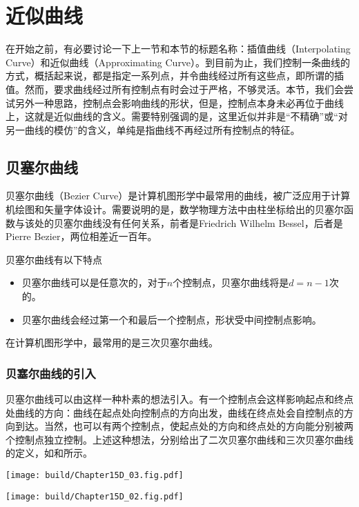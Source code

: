 \section{近似曲线}
在开始之前，有必要讨论一下上一节和本节的标题名称：插值曲线（Interpolating Curve）和近似曲线（Approximating Curve）。到目前为止，我们控制一条曲线的方式，概括起来说，都是指定一系列点，并令曲线经过所有这些点，即所谓的插值。然而，要求曲线经过所有控制点有时会过于严格，不够灵活。本节，我们会尝试另外一种思路，控制点会影响曲线的形状，但是，控制点本身未必再位于曲线上，这就是近似曲线的含义。需要特别强调的是，这里近似并非是“不精确”或“对另一曲线的模仿”的含义，单纯是指曲线不再经过所有控制点的特征。


\subsection{贝塞尔曲线}
贝塞尔曲线（Bezier Curve）是计算机图形学中最常用的曲线，被广泛应用于计算机绘图和矢量字体设计。需要说明的是，数学物理方法中由柱坐标给出的贝塞尔函数与该处的贝塞尔曲线没有任何关系，前者是Friedrich Wilhelm Bessel，后者是Pierre Bezier，两位相差近一百年。

贝塞尔曲线有以下特点
\begin{itemize}
    \item 贝塞尔曲线可以是任意次的，对于$n$个控制点，贝塞尔曲线将是$d=n-1$次的。
    \item 贝塞尔曲线会经过第一个和最后一个控制点，形状受中间控制点影响。
\end{itemize}

在计算机图形学中，最常用的是三次贝塞尔曲线。

\subsubsection{贝塞尔曲线的引入}
贝塞尔曲线可以由这样一种朴素的想法引入。有一个控制点会这样影响起点和终点处曲线的方向：曲线在起点处向控制点的方向出发，曲线在终点处会自控制点的方向到达。当然，也可以有两个控制点，使起点处的方向和终点处的方向能分别被两个控制点独立控制。上述这种想法，分别给出了二次贝塞尔曲线和三次贝塞尔曲线的定义，如和所示。
\begin{Figure}[贝塞尔曲线]
    \begin{FigureSub}[二次贝塞尔曲线]
        \texttt{[image: build/Chapter15D\_03.fig.pdf]}
    \end{FigureSub}
    \hspace{1cm}
    \begin{FigureSub}[三次贝塞尔曲线]
        \texttt{[image: build/Chapter15D\_02.fig.pdf]}
    \end{FigureSub}
\end{Figure}

